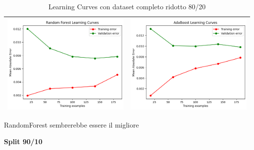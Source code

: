 \begin{table}[H]
\begin{tabularx}{\textwidth}{|X|X|}
        \includegraphics[width=\linewidth, trim=0 0 0 0]{images/RandomForest_lc80_ridotto.png} &
        \includegraphics[width=\linewidth, trim=0 0 0 0]{images/AdaBoost_lc80_ridotto.png} \\
        \hline
    \end{tabularx}
    \caption{Learning Curves con dataset completo ridotto 80/20}
    \label{tab:emissions_info}
\end{table}

\noindent RandomForest sembrerebbe essere il migliore



\noindent\textbf{Split 90/10}


